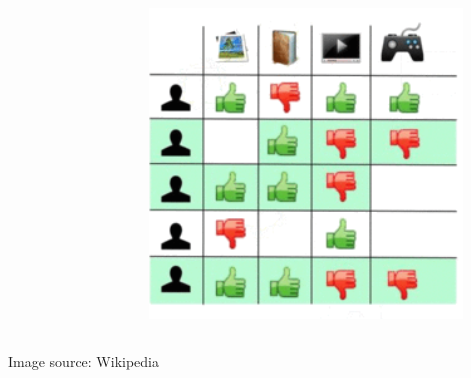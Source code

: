 \documentclass[11pt]{beamer}
\makeatletter
\def\tikzscale{1}\begin{lrbox}{\measure@tikzpicture}%
\edef\tikzscale{\pgfmathresult}%
\makeatother
\begin{document}
\begin{frame}
\begin{columns}
\begin{column}{0.3\textwidth}
			\end{column}\pause
			\begin{column}{0.05\textwidth}
				\begin{scaletikzpicturetowidth}{\textwidth}
				\end{scaletikzpicturetowidth}
			\end{column}
			\begin{column}{0.3\textwidth}
				\includegraphics[width=\textwidth]{images/cf-stage3.png}
			\end{column}
		\end{columns}
		\begin{center}
			\centering
			{\tiny Image source: Wikipedia}
		\end{center}
	\end{frame}
\end{document}
